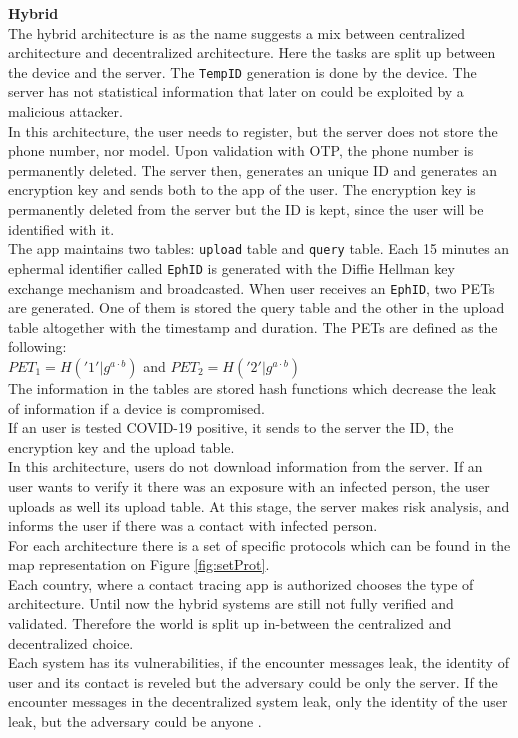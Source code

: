 \documentclass[a4paper, twocolumn]{article}
\begin{document}
\noindent \textbf{Hybrid}\\
The hybrid architecture is as the name suggests a mix between centralized architecture and decentralized architecture. Here the tasks are split up between the device and the server. The \texttt{TempID} generation is done by the device. The server has not statistical information that later on could be exploited by a malicious attacker.\\
In this architecture, the user needs to register, but the server does not store the phone number, nor model. Upon validation with OTP, the phone number is permanently deleted. The server then, generates an unique ID and generates an encryption key and sends both to the app of the user. The encryption key is permanently deleted from the server but the ID is kept, since the user will be identified with it.\\
The app maintains two tables: \texttt{upload} table and \texttt{query} table. Each 15 minutes an ephermal identifier called \texttt{EphID} is generated with the Diffie Hellman key exchange mechanism \cite{diffie} and broadcasted. When user receives an \texttt{EphID}, two PETs are generated. One of them is stored the query table and the other in the upload table altogether with the timestamp and duration. The PETs are defined as the following: \\
$PET_1 = H('1'|g^{a\cdot b})$ and $PET_2 = H('2'|g^{a\cdot b})$ \\
The information in the tables are stored hash functions which decrease the leak of information if a device is compromised.\\
If an user is tested COVID-19 positive, it sends to the server the ID, the encryption key and the upload table.\\
In this architecture, users do not download information from the server. If an user wants to verify it there was an exposure with an infected person, the user uploads as well its upload table. At this stage, the server makes risk analysis, and informs the user if there was a contact with infected person.\\

\noindent For each architecture there is a set of specific protocols which can be found in the map representation on Figure \ref{fig:setProt}.\\

\noindent Each country, where a contact tracing app is authorized chooses the type of architecture. Until now the hybrid systems are still not fully verified and validated. Therefore the world is split up in-between the centralized and decentralized choice.\\
Each system has its vulnerabilities, if the encounter messages leak, the identity of user and its contact is reveled but the adversary could be only the server. If the encounter messages in the decentralized system leak, only the identity of the user leak, but the adversary could be anyone \cite{orOr}.\\
\end{document}
